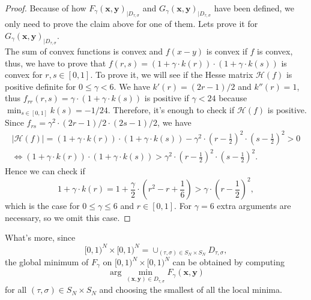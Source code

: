 \begin{proof} Because of how $F_{\gamma}(\textbf{x},\textbf{y})_{\mid D_{\tau,\sigma}}$ and $G_{\gamma}(\textbf{x},\textbf{y})_{\mid D_{\tau,\sigma}}$ have been defined, we only need to prove the claim above for one of them. Lets prove it for $G_{\gamma}(\textbf{x},\textbf{y})_{\mid D_{\tau,\sigma}}$.\\

The sum of convex functions is convex and $f(x-y)$ is convex if $f$ is convex, thus, we have to prove that $f(r,s) = (1+\gamma\cdot k(r))\cdot (1+\gamma\cdot k(s))$ is convex for $r,s\in [0,1]$. To prove it, we will see if the Hesse matrix $\mathcal{H}(f)$ is positive definite for $0\leq\gamma<6$. We have $k'(r) = (2r-1)/2$ and $k''(r) = 1$, thus $f_{rr}(r,s) = \gamma \cdot (1+\gamma\cdot k(s))$ is positive if $\gamma<24$ because $\min_{s\in[0,1]}{k(s)} = -1/24$. Therefore, it's enough to check if $\mathcal{H}(f)$ is positive. Since $f_{rs} = \gamma^2 \cdot (2r-1)/2 \cdot (2s-1)/2$, we have
\begin{multline*}
    \mid \mathcal{H}(f) \mid = (1+\gamma\cdot k(r))\cdot(1+\gamma\cdot k(s)) - \gamma^2 \cdot \left( r-\frac{1}{2} \right)^2 \cdot \left( s-\frac{1}{2} \right)^2 > 0 \\
    \Longleftrightarrow (1+\gamma\cdot k(r))\cdot(1+\gamma\cdot k(s)) > \gamma^2 \cdot \left( r-\frac{1}{2} \right)^2 \cdot \left( s-\frac{1}{2} \right)^2.
\end{multline*}
Hence we can check if
\begin{equation*}
    1+\gamma\cdot k(r) = 1 + \frac{\gamma}{2} \cdot \left( r^2-r+\frac{1}{6} \right) > \gamma \cdot \left( r - \frac{1}{2} \right)^2,
\end{equation*}
which is the case for $0\leq\gamma\leq 6$ and $r\in [0,1]$. For $\gamma=6$ extra arguments are necessary, so we omit this case.
\end{proof}

\vspace{2mm}
What's more, since
\begin{equation*}
    [0,1)^N\times[0,1)^N = \cup_{(\tau,\sigma) \in S_N\times S_N} D_{\tau,\sigma},
\end{equation*}
the global minimum of $F_{\gamma}$ on $[0,1)^N\times[0,1)^N$ can be obtained by computing
\begin{equation*}
    \arg \min_{(\textbf{x},\textbf{y})\in D_{\tau,\sigma}}{F_{\gamma}(\textbf{x},\textbf{y})}
\end{equation*}
for all $(\tau,\sigma) \in S_N\times S_N$ and choosing the smallest of all the local minima.\\

